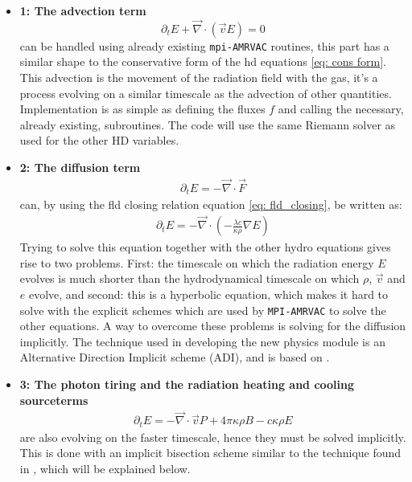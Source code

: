\begin{itemize}
\item \textbf{1: The advection term}
\begin{equation}
\partial_t E + \vec{\nabla} \cdot \left( \vec{v} E \right) = 0
\end{equation}
can be handled using already existing \texttt{mpi-AMRVAC} routines, this part has a similar shape to the conservative form of the hd equations \eqref{eq: cons form}. This advection is the movement of the radiation field with the gas, it's a process evolving on a similar timescale as the advection of other quantities. Implementation is as simple as defining the fluxes $f$ and calling the necessary, already existing, subroutines. The code will use the same Riemann solver as used for the other HD variables.\\

\item \textbf{2: The diffusion term}
\begin{align}
\partial_t E = - \vec{\nabla} \cdot \vec{F}
\end{align}
can, by using the fld closing relation equation \ref{eq: fld_closing}, be written as:
\begin{align}
\partial_t E = - \vec{\nabla} \cdot \left( -\frac{\lambda c}{\kappa \rho} \nabla E\right)
\end{align}
Trying to solve this equation together with the other hydro equations gives rise to two problems. First: the timescale on which the radiation energy $E$ evolves is much shorter than the hydrodynamical timescale on which $\rho$, $\vec{v}$ and $e$ evolve, and second: this is a hyperbolic equation, which makes it hard to solve with the explicit schemes which are used by \texttt{MPI-AMRVAC} to solve the other equations. A way to overcome these problems is solving for the diffusion implicitly. The technique used in developing the new physics module is an Alternative Direction Implicit scheme (ADI), and is based on \cite{Turener12001}.\\

\item \textbf{3: The photon tiring and the radiation heating and cooling sourceterms}
\begin{align}
\partial_t E = - \vec{\nabla} \cdot \vec{v} P + 4\pi \kappa\rho B - c \kappa \rho E
\end{align}
are also evolving on the faster timescale, hence they must be solved implicitly. This is done with an implicit bisection scheme similar to the technique found in \cite{Turner12001}, which will be explained below.
\end{itemize}

